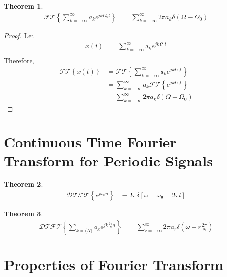 \documentclass[titlepage, fleqn, a4paper, 12pt, twoside]{article}
\theoremstyle{definition}
\theoremstyle{theorem}
\newtheorem{theorem}{Theorem}
\begin{document}
\begin{theorem}
	\begin{align*}
		\mathcal{FT}\left\{ \sum\limits_{k = -\infty}^{\infty} a_k e^{j k \Omega_0 t} \right\} &= \sum\limits_{k = -\infty}^{\infty} 2 \pi a_k \delta(\Omega - \Omega_0)
	\end{align*}
\end{theorem}

\begin{proof}
	Let
	\begin{align*}
		x(t) &= \sum\limits_{k = -\infty}^{\infty} a_k e^{j k \Omega_0 t}\\
	\end{align*}
	Therefore,
	\begin{align*}
		\mathcal{FT}\left\{ x(t) \right\} &= \mathcal{FT}\left\{ \sum\limits_{k = -\infty}^{\infty} a_k e^{j k \Omega_0 t} \right\}\\
		&= \sum\limits_{k = -\infty}^{\infty} a_k \mathcal{FT}\left\{ e^{j k \Omega_0 t} \right\}\\
		&= \sum\limits_{k = -\infty}^{\infty} 2 \pi a_k \delta(\Omega - \Omega_0)
	\end{align*}
\end{proof}

\section{Continuous Time Fourier Transform for Periodic Signals}

\begin{theorem}
	\begin{align*}
		\mathcal{DTFT}\left\{ e^{j \omega_0 n} \right\} &= 2 \pi \delta[\omega - \omega_0 - 2 \pi l]
	\end{align*}
\end{theorem}

\begin{theorem}
	\begin{align*}
		\mathcal{DTFT}\left\{ \sum\limits_{k = \langle N \rangle} a_k e^{j k \frac{2 \pi}{N} n} \right\} &= \sum\limits_{r = -\infty}^{\infty} 2 \pi a_r \delta\left( \omega - r \frac{2 \pi}{N} \right)
	\end{align*}
\end{theorem}

\section{Properties of Fourier Transform}
\end{document}
